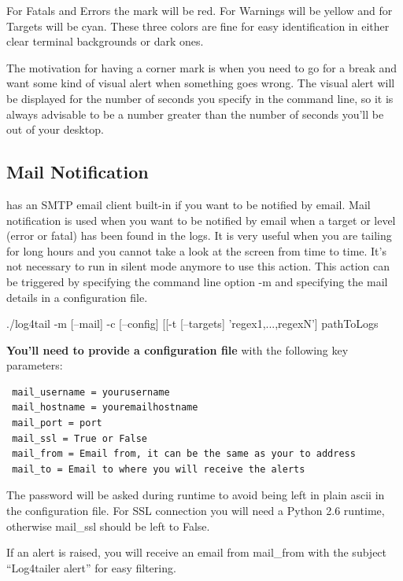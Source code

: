 For Fatals and Errors the mark will be red. For Warnings will be yellow and for Targets 
will be cyan. These three colors are fine for easy identification in either clear terminal
backgrounds or dark ones.

The motivation for having a corner mark is when you need to go for a break and
want some kind of visual alert when something goes wrong. The visual alert will
be displayed for the number of seconds you specify in the command line, so it
is always advisable to be a number greater than the number of seconds you'll be
out of your desktop. 

\subsection{Mail Notification}
\label{sec:mailnotification}
\logftailer{} has an SMTP email client built-in if you want to be notified by email.
Mail notification is used when you want to be notified by email when a target or level (error or fatal) has been found 
in the logs. It is very useful when you are tailing for long hours and you cannot take 
a look at the screen from time to time. It's not necessary to run in silent mode anymore 
to use this action.
This action can be triggered by specifying the command line option -m and
specifying the mail details in a configuration file. 

\begin{cmd}
 ./log4tail -m [--mail] -c [--config] [[-t [--targets] 'regex1,...,regexN'] pathToLogs
\end{cmd}

\textbf{You'll need to provide a configuration file} with the following key parameters:

\begin{config}
\begin{verbatim}
 mail_username = yourusername
 mail_hostname = youremailhostname 
 mail_port = port
 mail_ssl = True or False
 mail_from = Email from, it can be the same as your to address 
 mail_to = Email to where you will receive the alerts
\end{verbatim}
\end{config}

\noindent
The password will be asked during runtime to avoid being left 
in plain ascii in the configuration file. For SSL connection you will need a Python 2.6 runtime, otherwise 
mail\_ssl should be left to False.

If an alert is raised, you will receive an email from mail\_from with the subject ``Log4tailer 
alert'' for easy filtering.

